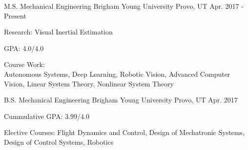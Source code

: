 

\begin{cventries}

  \cventry
    {M.S. Mechanical Engineering} %
    {Brigham Young University} %
    {Provo, UT} %
    {Apr. 2017 - Present} %
    {
      \begin{cvitems} %
        \item {Research: Visual Inertial Estimation}
        \item {GPA: 4.0/4.0}
        \item {Course Work: \\ Autonomous Systems, Deep Learning, Robotic Vision,
          Advanced Computer Vision, Linear System Theory, Nonlinear System Theory}
      \end{cvitems}
    }

  \cventry
    {B.S. Mechanical Engineering} %
    {Brigham Young University} %
    {Provo, UT} %
    {Apr. 2017} %
    {
      \begin{cvitems} %
        \item {Cummulative GPA: 3.99/4.0}
        \item {Elective Courses: Flight Dynamics and Control, Design of
          Mechatronic Systems, Design of Control Systems, Robotics}
      \end{cvitems}
    }

\end{cventries}
